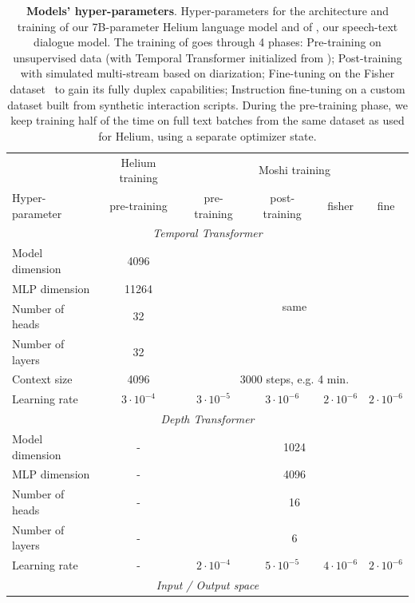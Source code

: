 \begin{table}[t]
  \centering
  \caption{\label{tab:hparams}\textbf{Models' hyper-parameters}. Hyper-parameters for the architecture and training of our 7B-parameter Helium language model and of \ours, our speech-text dialogue model. 
  The training of \ours{} goes through 4 phases: Pre-training on unsupervised data (with Temporal Transformer initialized from \helium); Post-training with simulated multi-stream based on diarization; Fine-tuning on the Fisher dataset~\citep{cieri2004fisher} to gain its fully duplex capabilities; Instruction fine-tuning on a custom dataset built from synthetic interaction scripts. During the pre-training phase, we keep training half of the time on full text batches from the same dataset as used for Helium, using a separate optimizer state.}
  \footnotesize
  \begin{tabular}{l|c|cccc}
    \toprule
      &
    \multicolumn{1}{c|}{Helium training} &
    \multicolumn{4}{c}{Moshi training} \\
    Hyper-parameter & pre-training  & pre-training & post-training & fisher & fine\\
    \midrule
    \multicolumn{6}{c}{\textit{Temporal Transformer}} \\
    \midrule[0.3pt]
    Model dimension    & 4096 & \multicolumn{4}{c}{\multirow{4}{*}{same}}\\
    MLP dimension      & 11264 \\
    Number of heads    & 32 \\
    Number of layers   & 32 \\
    Context size       & 4096 & \multicolumn{4}{c}{3000 steps, e.g. 4 min.} \\
    Learning rate      & $3 \cdot 10^{-4}$ & $3 \cdot 10^{-5}$ & $3 \cdot 10^{-6}$ &  $2 \cdot 10^{-6}$ &  $2 \cdot 10^{-6}$\\
    \midrule
    \multicolumn{6}{c}{\textit{Depth Transformer}} \\
    \midrule[0.3pt]
    Model dimension    & - & \multicolumn{4}{c}{1024}\\
    MLP dimension      & - & \multicolumn{4}{c}{4096} \\
    Number of heads    & - & \multicolumn{4}{c}{16}\\
    Number of layers   & - & \multicolumn{4}{c}{6}\\
    Learning rate      & - & $2 \cdot 10^{-4}$ & $5 \cdot 10^{-5}$ &  $4 \cdot 10^{-6}$ &    $2 \cdot 10^{-6}$\\
    \midrule
    \multicolumn{6}{c}{\textit{Input / Output space}} \\

\end{tabular}
\end{table}
